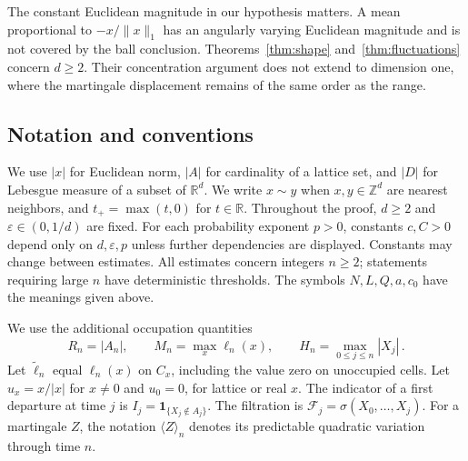 \documentclass[11pt]{amsart}
\theoremstyle{plain}
\theoremstyle{definition}
\newcommand{\Z}{\mathbb Z}
\newcommand{\R}{\mathbb R}
\newcommand{\eps}{\varepsilon}
\newcommand{\ind}{\mathbf 1}
\begin{document}
The constant Euclidean magnitude in our hypothesis matters.
A mean proportional to $-x/\|x\|_1$ has an angularly varying Euclidean
magnitude and is not covered by the ball conclusion.
Theorems~\ref{thm:shape} and~\ref{thm:fluctuations} concern $d\geq2$.
Their concentration argument does not extend to dimension one, where
the martingale displacement remains of the same order as the range.

\subsection{Notation and conventions}

We use $|x|$ for Euclidean norm, $|A|$ for cardinality of a lattice set,
and $|D|$ for Lebesgue measure of a subset of $\R^d$.
We write $x\sim y$ when $x,y\in\Z^d$ are nearest neighbors, and
$t_+=\max(t,0)$ for $t\in\R$.
Throughout the proof, $d\geq2$ and $\eps\in(0,1/d)$ are fixed.
For each probability exponent $p>0$, constants $c,C>0$ depend only on
$d,\eps,p$ unless further dependencies are displayed. Constants may
change between estimates. All estimates concern integers $n\geq2$;
statements requiring large $n$ have deterministic thresholds.
The symbols $N,L,Q,a,c_0$ have the meanings given above.

We use the additional occupation quantities
\begin{equation}\label{eq:occupation}
R_n=|A_n| ,\qquad M_n=\max_x\ell_n(x) ,\qquad
H_n=\max_{0\leq j\leq n}|X_j|\, .
\end{equation}
Let $\widetilde\ell_n$ equal $\ell_n(x)$ on $C_x$, including the
value zero on unoccupied cells. Let $u_x=x/|x|$ for $x\ne0$ and
$u_0=0$, for lattice or real $x$. The indicator of a first departure
at time $j$ is $I_j=\ind_{\{X_j\notin A_j\}}$.
The filtration is $\mathcal F_j=\sigma(X_0,\ldots,X_j)$.
For a martingale $Z$, the notation $\langle Z\rangle_n$ denotes
its predictable quadratic variation through time $n$.







\end{document}
